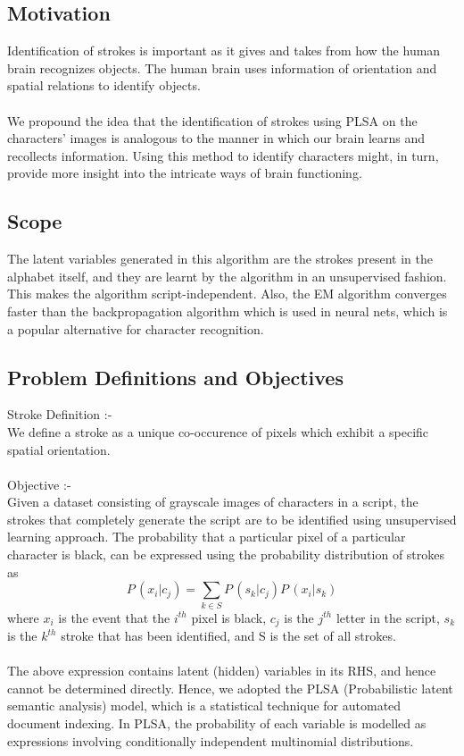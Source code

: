 \documentclass[10pt]{article}
\begin{document}
		\subsection{Motivation}
			Identification of strokes is important as it gives and takes from how the human brain recognizes objects. The human brain uses information of orientation and spatial relations to identify objects. \cite{dicarlo}\\\\
			We propound the idea that the identification of strokes using PLSA on the characters' images is analogous to the manner in which our brain learns and recollects information. Using this method to identify characters might, in turn, provide more insight into the intricate ways of brain functioning.
		\subsection{Scope}
			The latent variables generated in this algorithm are the strokes present in the alphabet itself, and they are learnt by the algorithm in an unsupervised fashion. This makes the algorithm script-independent. Also, the EM algorithm converges faster than the backpropagation algorithm  which is used in neural nets, which is a popular alternative for character recognition.
		\subsection{Problem Definitions and Objectives}
			Stroke Definition :-\\We define a stroke as a unique co-occurence of pixels which exhibit a specific spatial orientation.\\\\ 
			Objective :-\\Given a dataset consisting of grayscale images of characters in a script, the strokes that completely generate the script are to be identified using unsupervised learning approach.
			The probability that a particular pixel of a particular character is black, can be expressed using the probability distribution of strokes as\\
			\begin{equation}
			P\,(x_i|c_j)=\sum_{k\in S} P\,(s_k|c_j)P\,(x_i|s_k)
			\end{equation}
			where $x_{i}$ is the event that the $i^{th}$ pixel is black, $c_{j}$ is the $j^{th}$ letter in the script, $s_{k}$ is the $k^{th}$ stroke that has been identified, and S is the set of all strokes.\\\\
			The above expression contains latent (hidden) variables in its RHS, and hence cannot be determined directly. Hence, we adopted the PLSA (Probabilistic latent semantic analysis) model, which is a statistical technique for automated document indexing. In PLSA, the probability of each variable is modelled as expressions involving conditionally independent multinomial distributions.
\end{document}
